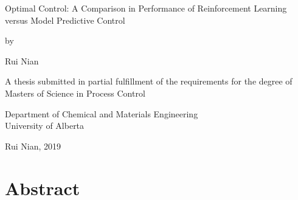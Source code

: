\documentclass[12pt]{report}
\begin{document}
\begin{titlepage}
    \begin{center}
    
        \vspace*{1.1cm}
        
        \LARGE
        Optimal Control: A Comparison in Performance of Reinforcement Learning versus Model Predictive Control \\
        
        \vspace{1cm}
        
        \normalsize by \\
        
        \vspace{1cm}
        
        \large Rui Nian \\
        
        \vspace{3cm}
        
        A thesis submitted in partial fulfillment of the requirements for the degree of \\
        \vspace{1cm}
        Masters of Science in Process Control \\
        
        \vspace{3.5cm}
        
        Department of Chemical and Materials Engineering \\
        University of Alberta \\
        
        \vspace{1cm}
        
        \textcopyright \hspace{1mm} Rui Nian, 2019 \\
        

    \end{center}
\end{titlepage}



\chapter*{Abstract}
\end{document}

